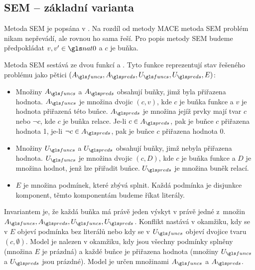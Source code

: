 \subsection{SEM -- základní varianta}

Metoda SEM je popsána v \cite{zhang1995sem}.
Na rozdíl od metody MACE metoda SEM problém nikam nepřevádí, ale rovnou
ho sama řeší.
Pro popis metody SEM budeme předpokládat $v, v' \in \nat0$ a $c$ je buňka.

Metoda SEM sestává ze dvou funkcí  a .
Tyto funkce reprezentují stav řešeného problému jako
pětici $(A_\funcs, A_\preds, U_\funcs, U_\preds, E)$:


\begin{itemize}
\item Množiny $A_\funcs$ a $A_\preds$ obsahují buňky,
  jimž byla přiřazena hodnota. $A_\funcs$ je množina dvojic
  $(c, v)$, kde $c$ je buňka funkce a $v$
  je hodnota přiřazená této buňce. $A_\preds$ je množina
  jejíž prvky mají tvar $c$ nebo $\neg c$, kde $c$ je buňka
  relace. Je-li $c \in A_\preds$, pak je buňce $c$ přiřazena hodnota 1,
  je-li $\neg c \in A_\preds$, pak je buňce $c$ přiřazena hodnota 0.
\item Množiny $U_\funcs$ a $U_\preds$ obsahují buňky,
  jimž nebyla přiřazena hodnota. $U_\funcs$ je množina
  dvojic $(c, D)$, kde $c$ je buňka funkce a $D$
  je množina hodnot, jenž lze přiřadit buňce.
  $U_\preds$ je množina buněk relací.
\item $E$ je množina podmínek, které zbývá splnit.
  Každá podmínka je disjunkce komponent, těmto komponentám
  budeme říkat literály.
\end{itemize}
Invariantem je, že každá buňka má právě jeden výskyt
v právě jedné z~množin $A_\funcs, A_\preds, U_\funcs, U_\preds$.
Konflikt nastává v okamžiku, kdy se v $E$ objeví podmínka bez literálů
nebo kdy se v $U_\funcs$ objeví dvojice tvaru $(c, \emptyset)$.
Model je nalezen v okamžiku, kdy jsou všechny podmínky
splněny (množina $E$ je prázdná) a každé buňce je přiřazena
hodnota (množiny $U_\funcs$ a $U_\preds$ jsou prázdné).
Model je určen množinami $A_\funcs$ a $A_\preds$.

